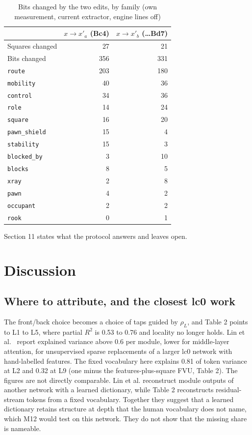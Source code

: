 \documentclass[conference]{IEEEtran}
\begin{document}
\begin{table}[!t]
\centering
\renewcommand{\thetable}{5}
\caption{Bits changed by the two edits, by family (own measurement, current extractor, engine lines off)}
\label{tab:5}
\footnotesize
\begin{tabular}{lrr}
\toprule
 & $x\to x'_a$ (Bc4) & $x\to x'_b$ (\ldots{}Bd7) \\
\midrule
Squares changed & 27 & 21 \\
Bits changed & 356 & 331 \\
\texttt{route} & 203 & 180 \\
\texttt{mobility} & 40 & 36 \\
\texttt{control} & 34 & 36 \\
\texttt{role} & 14 & 24 \\
\texttt{square} & 16 & 20 \\
\texttt{pawn\_\allowbreak{}shield} & 15 & 4 \\
\texttt{stability} & 15 & 3 \\
\texttt{blocked\_\allowbreak{}by} & 3 & 10 \\
\texttt{blocks} & 8 & 5 \\
\texttt{xray} & 2 & 8 \\
\texttt{pawn} & 4 & 2 \\
\texttt{occupant} & 2 & 2 \\
\texttt{rook} & 0 & 1 \\
\bottomrule
\end{tabular}
\end{table}

Section 11 states what the protocol answers and leaves open.

\section{Discussion}\label{sec:11}
\subsection{Where to attribute, and the closest lc0 work}\label{sec:11.1}
The front/\allowbreak{}back choice becomes a choice of taps guided by $\rho_L$, and Table 2 points to L1 to L5, where partial $R^2$ is 0.53 to 0.76 and locality no longer holds. Lin et al.~\cite{lin2026} report explained variance above 0.6 per module, lower for middle-layer attention, for unsupervised sparse replacements of a larger lc0 network with hand-labelled features. The fixed vocabulary here explains 0.81 of token variance at L2 and 0.32 at L9 (one minus the features-plus-square FVU, Table 2). The figures are not directly comparable. Lin et al. reconstruct module outputs of another network with a learned dictionary, while Table 2 reconstructs residual-stream tokens from a fixed vocabulary. Together they suggest that a learned dictionary retains structure at depth that the human vocabulary does not name, which M12 would test on this network. They do not show that the missing share is nameable.
\end{document}
